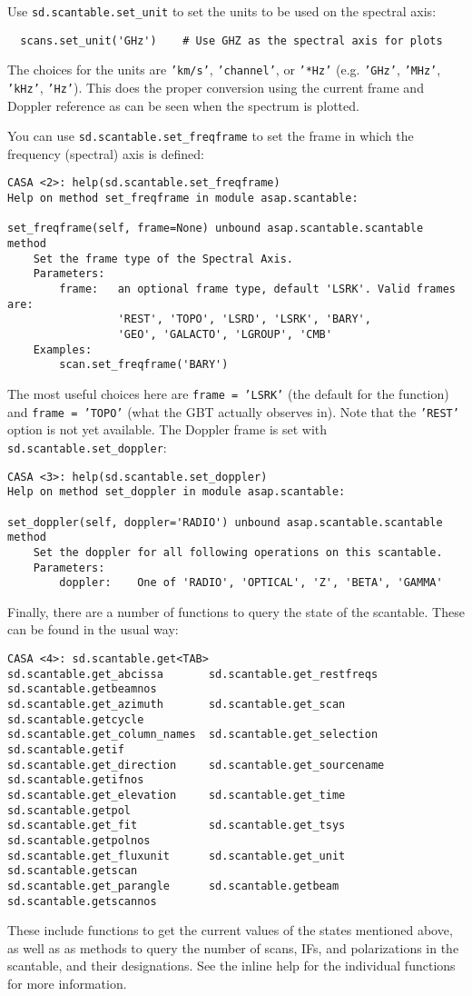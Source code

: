 Use {\tt sd.scantable.set\_unit} to set the units to be used on 
the spectral axis:
\small
\begin{verbatim}
  scans.set_unit('GHz')    # Use GHZ as the spectral axis for plots
\end{verbatim}
\normalsize
The choices for the units are {\tt 'km/s'}, {\tt 'channel'}, or
{\tt '*Hz'} (e.g. {\tt 'GHz'}, {\tt 'MHz'}, {\tt 'kHz'}, {\tt 'Hz'}).
This does the proper conversion using the current frame and Doppler
reference as can be seen when the spectrum is plotted.

You can use {\tt sd.scantable.set\_freqframe}
to set the frame in which the frequency (spectral) axis is defined:
\small
\begin{verbatim}
CASA <2>: help(sd.scantable.set_freqframe)
Help on method set_freqframe in module asap.scantable:

set_freqframe(self, frame=None) unbound asap.scantable.scantable method
    Set the frame type of the Spectral Axis.
    Parameters:
        frame:   an optional frame type, default 'LSRK'. Valid frames are:
                 'REST', 'TOPO', 'LSRD', 'LSRK', 'BARY',
                 'GEO', 'GALACTO', 'LGROUP', 'CMB'
    Examples:
        scan.set_freqframe('BARY')
\end{verbatim}
\normalsize
The most useful choices here are {\tt frame = 'LSRK'} (the default for
the function) and {\tt frame = 'TOPO'} (what the GBT actually observes
in).  Note that the {\tt 'REST'} option is not yet available.
The Doppler frame is set with {\tt sd.scantable.set\_doppler}:
\small
\begin{verbatim}
CASA <3>: help(sd.scantable.set_doppler)
Help on method set_doppler in module asap.scantable:

set_doppler(self, doppler='RADIO') unbound asap.scantable.scantable method
    Set the doppler for all following operations on this scantable.
    Parameters:
        doppler:    One of 'RADIO', 'OPTICAL', 'Z', 'BETA', 'GAMMA'
\end{verbatim}
\normalsize

Finally, there are a number of functions to query the state of the
scantable.  These can be found in the usual way:
\small
\begin{verbatim}
CASA <4>: sd.scantable.get<TAB>
sd.scantable.get_abcissa       sd.scantable.get_restfreqs     sd.scantable.getbeamnos
sd.scantable.get_azimuth       sd.scantable.get_scan          sd.scantable.getcycle
sd.scantable.get_column_names  sd.scantable.get_selection     sd.scantable.getif
sd.scantable.get_direction     sd.scantable.get_sourcename    sd.scantable.getifnos
sd.scantable.get_elevation     sd.scantable.get_time          sd.scantable.getpol
sd.scantable.get_fit           sd.scantable.get_tsys          sd.scantable.getpolnos
sd.scantable.get_fluxunit      sd.scantable.get_unit          sd.scantable.getscan
sd.scantable.get_parangle      sd.scantable.getbeam           sd.scantable.getscannos
\end{verbatim}
\normalsize
These include functions to get the current values of the states
mentioned above, as well as
as methods to query the number of scans, IFs, and polarizations
in the scantable, and their designations.  See the
inline help for the individual functions for more information.

